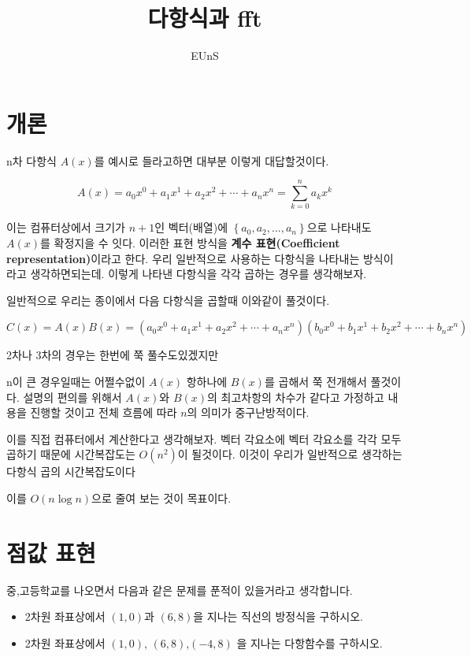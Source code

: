 \documentclass{oblivoir}
\title{다항식과 fft}
\author{EUnS}
\begin{document}
    

\maketitle

\section{개론}

n차 다항식 $A(x)$를 예시로 들라고하면 대부분 이렇게 대답할것이다.

$$A(x) = a_0x^0 + a_1x^1 + a_2x^2 + \cdots + a_{n}x^n = \sum_{k=0}^{n} a_kx^k$$

이는 컴퓨터상에서 크기가 $n+1$인 벡터(배열)에 $\left\{a_0,a_2, ... , a_n \right\}$으로 나타내도 $A(x)$를 확정지을 수 잇다. 이러한 표현 방식을 \textbf{계수 표현(Coefficient representation)}이라고 한다.
우리 일반적으로 사용하는 다항식을 나타내는 방식이라고 생각하면되는데. 
이렇게 나타낸 다항식을 각각 곱하는 경우를 생각해보자.

일반적으로 우리는 종이에서 다음 다항식을 곱할때 이와같이 풀것이다.

$C(x) = A(x)B(x) = (a_0x^0 + a_1x^1 + a_2x^2 + \cdots + a_nx^n)(b_0x^0 + b_1x^1 + b_2x^2 + \cdots + b_nx^n)$ 

2차나 3차의 경우는 한번에 쭉 풀수도있겠지만

n이 큰 경우일때는 어쩔수없이 $A(x)$ 항하나에 $B(x)$를 곱해서 쭉 전개해서 풀것이다. 설명의 편의를 위해서 $A(x)$와 $B(x)$의 최고차항의 차수가 같다고 가정하고 내용을 진행할 것이고 전체 흐름에 따라 $n$의 의미가 중구난방적이다.

이를 직접 컴퓨터에서 계산한다고 생각해보자.
벡터 각요소에 벡터 각요소를 각각 모두 곱하기 때문에 시간복잡도는 $O(n^2)$이 될것이다. 이것이 우리가 일반적으로 생각하는 다항식 곱의 시간복잡도이다

이를 $O(n \log n)$으로 줄여 보는 것이 목표이다.

\section{점값 표현}

중,고등학교를 나오면서 다음과 같은 문제를 푼적이 있을거라고 생각합니다.

\begin{framed}
    \begin{itemize}
        \item 2차원 좌표상에서 $(1,0)$과 $(6,8)$을 지나는 직선의 방정식을 구하시오.
        \item 2차원 좌표상에서 $(1,0)$, $(6,8)$,$(-4,8)$ 을 지나는 다항함수를 구하시오.
    \end{itemize}
\end{framed}
\end{document}
